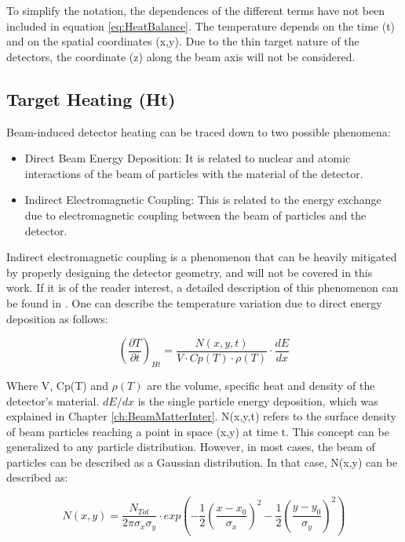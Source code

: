 To simplify the notation, the dependences of the different terms have not been included in equation \ref{eq:HeatBalance}. The temperature depends on the time (t) and on the spatial coordinates (x,y). Due to the thin target nature of the detectors, the coordinate (z) along the beam axis will not be considered. 

\subsection{Target Heating (Ht)}

Beam-induced detector heating can be traced down to two possible phenomena: 

\begin{itemize}
    \item Direct Beam Energy Deposition: It is related to nuclear and atomic interactions of the beam of particles with the material of the detector. 
    \item Indirect Electromagnetic Coupling: This is related to the energy exchange due to electromagnetic coupling between the beam of particles and the detector. 
\end{itemize}

Indirect electromagnetic coupling is a phenomenon that can be heavily mitigated by properly designing the detector geometry, and will not be covered in this work. If it is of the reader interest, a detailed description of this phenomenon can be found in \parencite[][]{ref:ElectroHeating}. One can describe the temperature variation due to direct energy deposition as follows: 

\begin{equation}
    \left(\frac{\partial T}{\partial t}\right)_{Ht} = \frac{N (x,y,t)}{V\cdot Cp(T)\cdot \rho (T)}\cdot \frac{dE}{dx}
\end{equation}

Where V, Cp(T) and $\rho (T)$ are the volume, specific heat and density of the detector's material. $dE/dx$ is the single particle energy deposition, which was explained in Chapter \ref{ch:BeamMatterInter}. N(x,y,t) refers to the surface density of beam particles reaching a point in space (x,y) at time t. This concept can be generalized to any particle distribution. However, in most cases, the beam of particles can be described as a Gaussian distribution. In that case, N(x,y) can be described as: 

\begin{equation}
    N(x,y) = \frac{N_{Tot}}{2 \pi \sigma_x \sigma_y}\cdot exp \left(
              -\frac{1}{2}\left(\frac{x-x_0}{\sigma_x}\right)^2 - \frac{1}{2}\left(\frac{y - y_0}{\sigma_y}\right)^2\right)
\end{equation}

